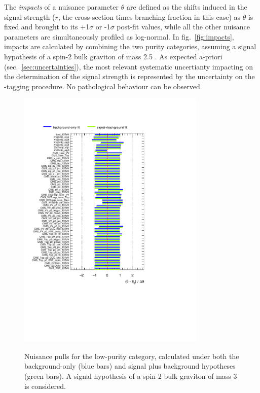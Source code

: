 \noindent The \emph{impacts} of a nuisance parameter $\theta$ are defined as the shifts induced in the signal strength ($r$, the cross-section times branching fraction in this case) as $\theta$ is fixed and brought to its +1$\sigma$ or -1$\sigma$ post-fit values, while all the other nuisance parameters are simultaneously profiled as log-normal. In fig.~\ref{fig:impacts}, impacts are calculated by combining the two purity categories, assuming a signal hypothesis of a spin-2 bulk graviton of mass 2.5 \TeV. As expected a-priori (sec.~\ref{sec:uncertainties}), the most relevant systematic uncertianty impacting on the determination of the signal strength is represented by the uncertainty on the \V-tagging procedure. No pathological behaviour can be observed. %

\begin{figure}[!h]
   \caption{Nuisance pulls for the low-purity category, calculated under both the background-only (blue bars) and signal plus background hypotheses (green bars). A signal hypothesis of a spin-2 bulk graviton of mass 3 \TeV is considered.}
 \begin{center}
   \includegraphics[width=0.8\textwidth]{pulls_VZ_data_1fb/pulls_XZZInv_lp3000.pdf}
   \label{fig:pulls_lp}
 \end{center}
\end{figure}

